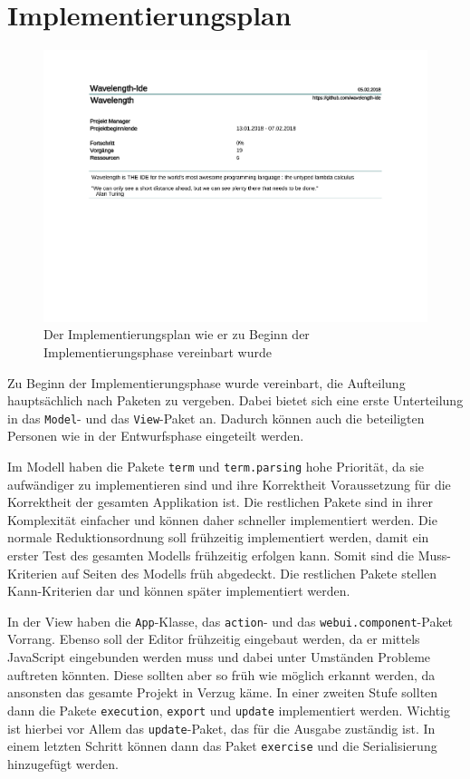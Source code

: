 \documentclass[parskip=full,11pt]{scrartcl}
\begin{document}
\newpage
\section{Implementierungsplan}
\begin{figure}[h]
\hspace*{-2cm}
\includegraphics[trim={0, 9.5cm, 0, 0}, clip, scale=0.65, page=4]{Implementierungsplan/Implementierungsplan-vorher.pdf}
\caption{Der Implementierungsplan wie er zu Beginn der Implementierungsphase vereinbart wurde}
\end{figure}

Zu Beginn der Implementierungsphase wurde vereinbart, die Aufteilung hauptsächlich nach Paketen zu vergeben.
Dabei bietet sich eine erste Unterteilung in das \texttt{Model}- und das \texttt{View}-Paket an.
Dadurch können auch die beteiligten Personen wie in der Entwurfsphase eingeteilt werden.

Im Modell haben die Pakete \texttt{term} und \texttt{term.parsing} hohe Priorität, da sie aufwändiger zu implementieren
sind und ihre Korrektheit Voraussetzung für die Korrektheit der gesamten Applikation ist.
Die restlichen Pakete sind in ihrer Komplexität einfacher und können daher schneller implementiert werden.
Die normale Reduktionsordnung soll frühzeitig implementiert werden, damit ein erster Test des gesamten Modells frühzeitig erfolgen kann.
Somit sind die Muss-Kriterien auf Seiten des Modells früh abgedeckt.
Die restlichen Pakete stellen Kann-Kriterien dar und können später implementiert werden.

In der View haben die \texttt{App}-Klasse, das \texttt{action}- und das \texttt{webui.component}-Paket Vorrang.
Ebenso soll der Editor frühzeitig eingebaut werden, da er mittels JavaScript eingebunden werden muss und dabei unter Umständen Probleme
auftreten könnten.
Diese sollten aber so früh wie möglich erkannt werden, da ansonsten das gesamte Projekt in Verzug käme.
In einer zweiten Stufe sollten dann die Pakete \texttt{execution}, \texttt{export} und \texttt{update} implementiert werden.
Wichtig ist hierbei vor Allem das \texttt{update}-Paket, das für die Ausgabe zuständig ist.
In einem letzten Schritt können dann das Paket \texttt{exercise} und die Serialisierung hinzugefügt werden.
\end{document}

